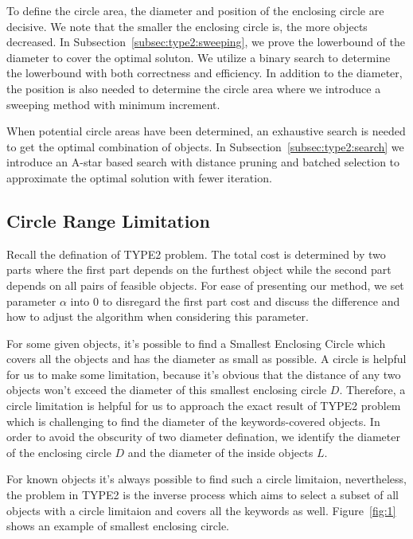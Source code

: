 \documentclass{sig-alternate}
\newcounter{example}[section]
\begin{document}
To define the circle area, the diameter and position of the enclosing circle are decisive.
We note that the smaller the enclosing circle is, the more objects decreased.
In Subsection~\ref{subsec:type2:sweeping},
we prove the lowerbound of the diameter to cover the optimal soluton. We utilize
a binary search to determine the lowerbound with both correctness and efficiency.
In addition to the diameter, the position is also needed to determine the circle area
where we introduce a sweeping method with minimum increment.
%

When potential circle areas have been determined, an exhaustive search is needed
to get the optimal combination of objects. In Subsection~\ref{subsec:type2:search}
we introduce an A-star based search with distance pruning and batched selection
to approximate the optimal solution with fewer iteration.

\subsection{Circle Range Limitation} \label{subsec:type2:limitation}
Recall the defination of \textsf{TYPE2} problem. The total cost is determined
by two parts where the first part depends on the furthest object while
the second part depends on all pairs of feasible objects.
For ease of presenting our method, we set parameter $\alpha$ into 0
to disregard the first part cost and discuss the difference and how to adjust the
algorithm when considering this parameter.\par
%
For some given objects, it's possible to find a \textsf{Smallest Enclosing Circle}
which covers all the objects and has the diameter as small as possible. A circle is
helpful for us to make some limitation, because it's obvious that the distance of
any two objects won't exceed the diameter of this smallest enclosing circle $D$.
Therefore, a circle limitation is helpful for us to approach the exact result
of \textsf{TYPE2} problem which is challenging to find the diameter of the keywords-covered
objects. In order to avoid the obscurity of two diameter defination, we identify the
diameter of the enclosing circle $D$ and the diameter of the inside objects $L$.\par
%

For known objects it's always possible to find such a circle limitaion,
nevertheless, the problem in \textsf{TYPE2} is the inverse process which aims to
select a subset of all objects with a circle limitaion and covers all the
keywords as well. Figure~\ref{fig:1} shows an example of smallest enclosing circle.
\end{document}

